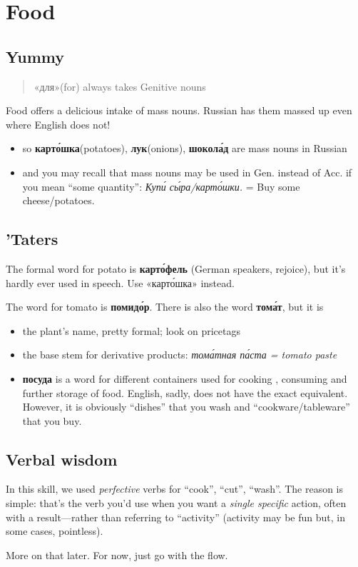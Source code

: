 \chapter{Food}\label{food}

\section{Yummy}\label{yummy}

\begin{quote}
«для»(for) always takes Genitive nouns
\end{quote}

Food offers a delicious intake of mass nouns. Russian has them massed up
even where English does not!

\begin{itemize}
\tightlist
\item
  so \textbf{карт\'{о}шка}(potatoes), \textbf{лук}(onions), \textbf{шокол\'{а}д}
  are mass nouns in Russian
\item
  and you may recall that mass nouns may be used in Gen. instead of Acc.
  if you mean ``some quantity'': \emph{Куп\'{и} с\'{ы}ра/карт\'{о}шки.} = Buy some
  cheese/potatoes.
\end{itemize}

\section{'Taters}\label{taters}

The formal word for potato is \textbf{карт\'{о}фель} (German speakers,
rejoice), but it's hardly ever used in speech. Use «карт\'{о}шка» instead.

The word for tomato is \textbf{помид\'{о}р}. There is also the word
\textbf{том\'{а}т}, but it is

\begin{itemize}
\item
  the plant's name, pretty formal; look on pricetags
\item
  the base stem for derivative products: \emph{том\'{а}тная п\'{а}ста = tomato
  paste}
\item
  \textbf{посуда} is a word for different containers used for cooking ,
  consuming and further storage of food. English, sadly, does not have
  the exact equivalent. However, it is obviously ``dishes'' that you
  wash and ``cookware/tableware'' that you buy.
\end{itemize}

\section{Verbal wisdom}\label{verbal-wisdom}

In this skill, we used \emph{perfective} verbs for ``cook'', ``cut'',
``wash''. The reason is simple: that's the verb you'd use when you want
a \emph{single specific} action, often with a result---rather than
referring to ``activity'' (activity may be fun but, in some cases,
pointless).

More on that later. For now, just go with the flow.
